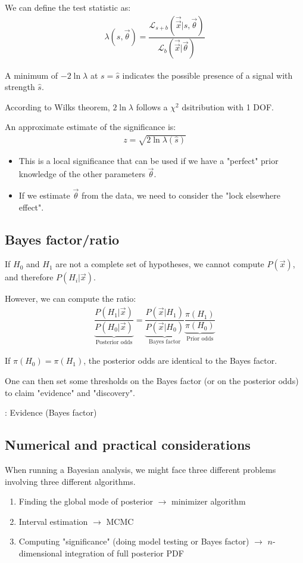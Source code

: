 We can define the test statistic as: 
\begin{align}
  \lambda(s, \vec{\theta}) = \dfrac{\mathcal{L}_{s+b} (\vec{\vec{x}}|s,\vec{\theta})}{\mathcal{L}_{b}(\vec{\vec{x}}|\vec{\theta})}
\end{align}

A minimum of $-2\ln\lambda$ at $s=\hat{s}$ indicates the possible presence of a signal with strength $\hat{s}$.

According to Wilks theorem, $2\ln\lambda$ follows a $\chi^2$ dsitribution with 1 DOF. 

An approximate estimate of the significance is: 
\begin{align}
  z = \sqrt{2 \ln \lambda(\hat{s})}
\end{align}

\begin{itemize}[$\to$]
  \item This is a local significance that can be used if we have a "perfect" prior knowledge of the other parameters $\vec{\theta}$.
  \item If we estimate $\vec{\theta}$ from the data, we need to consider the "lock elsewhere effect".
\end{itemize}

\subsection{Bayes factor/ratio}
If $H_0$ and $H_1$ are not a complete set of hypotheses, we cannot compute $P(\vec{x})$, and therefore $P(H_i|\vec{x})$.

However, we can compute the ratio: 
\begin{align}
  \underset{\text{Posterior odds}}{\underbrace{\dfrac{P(H_1|\vec{x})}{P(H_0|\vec{x})}}} = \underset{\text{Bayes factor}}{\underbrace{\dfrac{P(\vec{x}|H_1)}{P(\vec{x}|H_0)}}} \underset{\text{Prior odds}}{\underbrace{\dfrac{\pi(H_1)}{\pi(H_0)}}}
\end{align}

If $\pi(H_0)=\pi(H_1)$, the posterior odds are identical to the Bayes factor.

One can then set some thresholds on the Bayes factor (or on the posterior odds) to claim "evidence" and "discovery".

: Evidence (Bayes factor)

\subsection{Numerical and practical considerations}
When running a Bayesian analysis, we might face three different problems involving three different algorithms. 
\begin{enumerate}
  \item Finding the global mode of posterior $\to$ minimizer algorithm
  \item Interval estimation $\to$ MCMC
    \item Computing "significance" (doing model testing or Bayes factor) $\to$ $n$-dimensional integration of full posterior PDF
  \end{enumerate}
 
